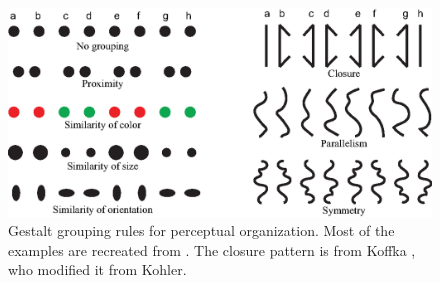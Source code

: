 \begin{figure}[t]
\centerline{
\includegraphics[width=1\linewidth]{figures/taxonomy/gestalt.eps}
} 
\caption{Gestalt grouping rules for perceptual organization. Most of the examples are recreated from \cite{Palmer1999}. The closure pattern is from Koffka \cite{Koffka1935}, who modified it from Kohler.} 
\label{fig:gestalt}
\end{figure}

